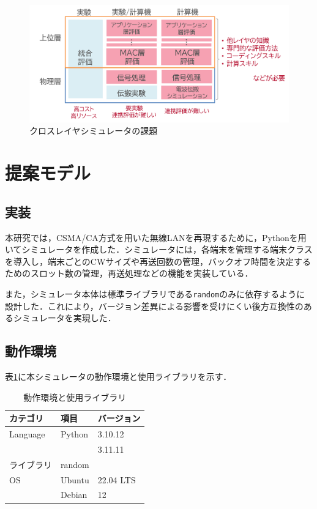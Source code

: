 \documentclass[a4paper,10pt]{ltjsarticle}
\begin{document}
\begin{figure}[H]
  \centering
  \includegraphics[width=\textwidth]{./assets/課題.png}
  \caption{クロスレイヤシミュレータの課題}
  \label{fig:problem}
\end{figure}



\clearpage
\section{提案モデル}

\subsection{実装}

本研究では，CSMA/CA方式を用いた無線LANを再現するために，Pythonを用いてシミュレータを作成した．シミュレータには，各端末を管理する端末クラスを導入し，端末ごとのCWサイズや再送回数の管理，バックオフ時間を決定するためのスロット数の管理，再送処理などの機能を実装している．

また，シミュレータ本体は標準ライブラリである\texttt{random}のみに依存するように設計した．これにより，バージョン差異による影響を受けにくい後方互換性のあるシミュレータを実現した．


\subsection{動作環境}

表\ref{tab:env}に本シミュレータの動作環境と使用ライブラリを示す．



\begin{table}[h]
  \centering
  \caption{動作環境と使用ライブラリ}
  \label{tab:env}
  \begin{tabular}{l|l|l}
      \hline
      カテゴリ & 項目 & バージョン \\ \hline
      Language           & Python        & 3.10.12 \\ 
      &               & 3.11.11 \\ \hline
      ライブラリ       & random         & \\ \hline
      OS               & Ubuntu        & 22.04 LTS \\ 
                       & Debian        & 12 \\ \hline
  \end{tabular}
\end{table}
\end{document}
